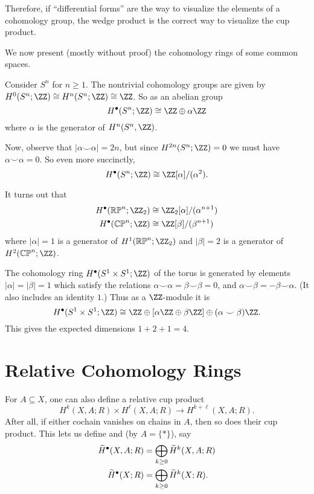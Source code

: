 Therefore, if ``differential forms'' are the way to visualize
the elements of a cohomology group, the wedge product is the
correct way to visualize the cup product.

We now present (mostly without proof)
the cohomology rings of some common spaces.

\begin{example}
	Consider $S^n$ for $n \ge 1$.
	The nontrivial cohomology groups are given by
	$H^0(S^n; \ZZ) \cong H^n(S^n; \ZZ) \cong \ZZ$.
	So as an abelian group
	\[ H^\bullet(S^n; \ZZ) \cong \ZZ \oplus \alpha \ZZ \]
	where $\alpha$ is the generator of $H^n(S^n, \ZZ)$.
	
	Now, observe that $|\alpha\smile\alpha| = 2n$, but
	since $H^{2n}(S^n; \ZZ) = 0$ we must have $\alpha\smile\alpha=0$.
	So even more succinctly,
	\[ H^\bullet(S^n; \ZZ) \cong \ZZ[\alpha]/(\alpha^2). \]
\end{example}

\begin{example}
	It turns out that
	\begin{align*}
		H^\bullet(\RP^n; \Zc2) &\cong \Zc2[\alpha]/(\alpha^{n+1}) \\
		H^\bullet(\CP^n; \ZZ) &\cong \ZZ[\beta]/(\beta^{n+1})
	\end{align*}
	where $|\alpha| = 1$ is a generator of $H^1(\RP^n; \Zc2)$
	and $|\beta| = 2$ is a generator of $H^2(\CP^n; \ZZ)$.
\end{example}

\begin{example}
	The cohomology ring $H^\bullet(S^1 \times S^1; \ZZ)$
	of the torus is generated by elements $|\alpha| = |\beta| = 1$
	which satisfy the relations
	$\alpha \smile \alpha = \beta \smile \beta = 0$,
	and $\alpha \smile \beta = -\beta \smile \alpha$.
	(It also includes an identity $1$.)
	Thus as a $\ZZ$-module it is
	\[ H^\bullet(S^1 \times S^1; \ZZ)
		\cong \ZZ \oplus \left[ \alpha \ZZ \oplus \beta \ZZ \right]
		\oplus (\alpha \smile \beta) \ZZ. \]
	This gives the expected dimensions $1+2+1=4$.
\end{example}


\section{Relative Cohomology Rings}
For $A \subseteq X$, one can also define a relative cup product
\[ H^k(X,A;R) \times H^\ell(X,A;R) \to H^{k+\ell}(X,A;R). \]
After all, if either cochain vanishes on chains in $A$,
then so does their cup product.
This lets us define 
and  (by $A = \{\ast\}$), say
\begin{align*}
\widetilde H^\bullet(X,A;R) &= \bigoplus_{k \ge 0} \widetilde H^k(X,A; R) \\
\widetilde H^\bullet(X;R) &= \bigoplus_{k \ge 0} \widetilde H^k(X;R).
\end{align*}

